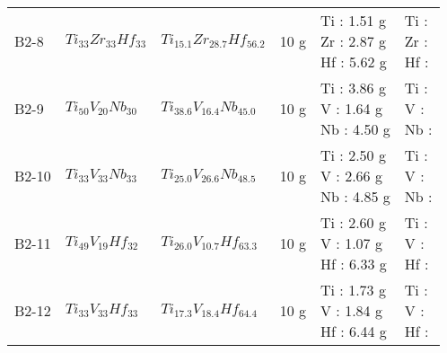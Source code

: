 \begin{tabular}{llllll}
             B2-8 &                                $Ti_{33}Zr_{33}Hf_{33}$ &                          $Ti_{15.1}Zr_{28.7}Hf_{56.2}$ &                                  10 g &                                            \makecell[l]{ Ti : 1.51 g \\ Zr : 2.87 g \\ Hf : 5.62 g \\} &                    \makecell[l]{ Ti :\\ Zr :\\ Hf :\\} \\
             B2-9 &                                 $Ti_{50}V_{20}Nb_{30}$ &                           $Ti_{38.6}V_{16.4}Nb_{45.0}$ &                                  10 g &                                             \makecell[l]{ Ti : 3.86 g \\ V : 1.64 g \\ Nb : 4.50 g \\} &                     \makecell[l]{ Ti :\\ V :\\ Nb :\\} \\
            B2-10 &                                 $Ti_{33}V_{33}Nb_{33}$ &                           $Ti_{25.0}V_{26.6}Nb_{48.5}$ &                                  10 g &                                             \makecell[l]{ Ti : 2.50 g \\ V : 2.66 g \\ Nb : 4.85 g \\} &                     \makecell[l]{ Ti :\\ V :\\ Nb :\\} \\
            B2-11 &                                 $Ti_{49}V_{19}Hf_{32}$ &                           $Ti_{26.0}V_{10.7}Hf_{63.3}$ &                                  10 g &                                             \makecell[l]{ Ti : 2.60 g \\ V : 1.07 g \\ Hf : 6.33 g \\} &                     \makecell[l]{ Ti :\\ V :\\ Hf :\\} \\
            B2-12 &                                 $Ti_{33}V_{33}Hf_{33}$ &                           $Ti_{17.3}V_{18.4}Hf_{64.4}$ &                                  10 g &                                             \makecell[l]{ Ti : 1.73 g \\ V : 1.84 g \\ Hf : 6.44 g \\} &                     \makecell[l]{ Ti :\\ V :\\ Hf :\\} \\
\bottomrule
\end{tabular}
